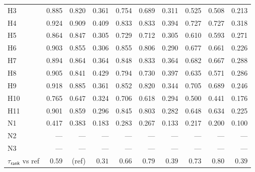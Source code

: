 \begin{table}[!htbp]
\begin{tabular*}{\linewidth}{@{\extracolsep{\fill}}l*{9}{r}@{}}
H3  & 0.885 & 0.820 & 0.361 & 0.754 & 0.689 & 0.311 & 0.525 & 0.508 & 0.213 \\
H4  & 0.924 & 0.909 & 0.409 & 0.833 & 0.833 & 0.394 & 0.727 & 0.727 & 0.318 \\
H5  & 0.864 & 0.847 & 0.305 & 0.729 & 0.712 & 0.305 & 0.610 & 0.593 & 0.271 \\
H6  & 0.903 & 0.855 & 0.306 & 0.855 & 0.806 & 0.290 & 0.677 & 0.661 & 0.226 \\
H7  & 0.894 & 0.864 & 0.364 & 0.848 & 0.833 & 0.364 & 0.682 & 0.667 & 0.288 \\
H8  & 0.905 & 0.841 & 0.429 & 0.794 & 0.730 & 0.397 & 0.635 & 0.571 & 0.286 \\
H9  & 0.918 & 0.885 & 0.361 & 0.852 & 0.820 & 0.344 & 0.705 & 0.689 & 0.246 \\
H10 & 0.765 & 0.647 & 0.324 & 0.706 & 0.618 & 0.294 & 0.500 & 0.441 & 0.176 \\
H11 & 0.901 & 0.859 & 0.296 & 0.845 & 0.803 & 0.282 & 0.648 & 0.634 & 0.225 \\
N1  & 0.417 & 0.383 & 0.183 & 0.283 & 0.267 & 0.133 & 0.217 & 0.200 & 0.100 \\
N2  & ---   & ---   & ---   & ---   & ---   & ---   & ---   & ---   & ---   \\
N3  & ---   & ---   & ---   & ---   & ---   & ---   & ---   & ---   & ---   \\
\midrule
$\tau_{\textsf{rank}}$ vs ref & $0.59$ & (ref) & $0.31$ & $0.66$ & $0.79$ & $0.39$ & $0.73$ & $0.80$ & $0.39$ \\
\bottomrule
\end{tabular*}
\end{table}